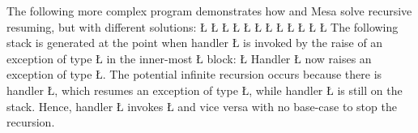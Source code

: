 \documentclass[openright,twoside]{report}
\begin{document}
The following more complex program demonstrates how \uC and Mesa solve recursive resuming, but with different solutions:
\LGinlinefalse\LGbegin\lgrinde
\L{}
\L{}
\L{\LB{}}
\L{}
\L{\LB{}}
\L{\LB{}}
\L{\LB{}}
\L{\LB{}}
\L{\LB{}}
\CE{}\L{\LB{}}
\CE{}\L{\LB{}}
\CE{}\L{\LB{\}}}
\endlgrinde\LGend
The following stack is generated at the point when handler \LGinlinetrue\LGbegin\lgrinde\L{}\endlgrinde\LGend{} is invoked by the raise of an exception of type \LGinlinetrue\LGbegin\lgrinde\L{}\endlgrinde\LGend{} in the inner-most \LGinlinetrue\LGbegin\lgrinde\L{}\endlgrinde\LGend{} block:
\LGinlinefalse\LGbegin\lgrinde
\L{}
\endlgrinde\LGend
Handler \LGinlinetrue\LGbegin\lgrinde\L{}\endlgrinde\LGend{} now raises an exception of type \LGinlinetrue\LGbegin\lgrinde\L{}\endlgrinde\LGend{}.
The potential infinite recursion occurs because there is handler \LGinlinetrue\LGbegin\lgrinde\L{}\endlgrinde\LGend{}, which resumes an exception of type \LGinlinetrue\LGbegin\lgrinde\L{}\endlgrinde\LGend{}, while handler \LGinlinetrue\LGbegin\lgrinde\L{}\endlgrinde\LGend{} is still on the stack.
Hence, handler \LGinlinetrue\LGbegin\lgrinde\L{}\endlgrinde\LGend{} invokes \LGinlinetrue\LGbegin\lgrinde\L{}\endlgrinde\LGend{} and vice versa with no base-case to stop the recursion.
\end{document}
